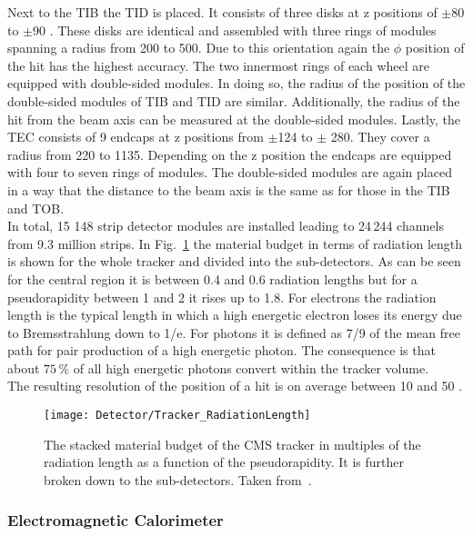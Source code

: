Next to the TIB the TID is placed. It consists of three disks at z positions of $\pm{}$80 to $\pm$90\cm{} . These disks are identical and assembled with three rings of modules spanning a radius from 200 to 500\mm{}. Due to this orientation again the $\phi{}$ position of the hit has the highest accuracy. The two innermost rings of each wheel are equipped with double-sided modules. In doing so, the radius of the position of the double-sided modules of TIB and TID are similar. Additionally, the radius of the hit from the beam axis can be measured at the double-sided modules. Lastly, the TEC consists of 9 endcaps at z positions from $\pm{}$124 to $\pm{}$ 280\cm{}. They cover a radius from 220 to 1135\mm{}. Depending on the z position the endcaps are equipped with four to seven rings of modules. The double-sided modules are again placed in a way that the distance to the beam axis is the same as for those in the TIB and TOB. \\
In total, 15 148 strip detector modules are installed leading to 24\,244 channels from 9.3 million strips. In Fig.~\ref{plot:LHCCMSTrackerRadiationLength} the material budget in terms of radiation length is shown for the whole tracker and divided into the sub-detectors. As can be seen for the central region it is between 0.4 and 0.6 radiation lengths but for a pseudorapidity between 1 and 2 it rises up to 1.8. For electrons the radiation length is the typical length in which a high energetic electron loses its energy due to Bremsstrahlung down to 1/e. For photons it is defined as 7/9 of the mean free path for pair production of a high energetic photon. The consequence is that about $75\,\%$ of all high energetic photons convert within the tracker volume.\\
The resulting resolution of the position of a hit is on average between 10 and 50\mum{} \cite{CMS-PAPER-TRK-11-001}.

\begin{figure}[Htb]
    \centering
    \texttt{[image: Detector/Tracker\_RadiationLength]}
    \caption[Material budget of the CMS Tracker]{The stacked material budget of the CMS tracker in multiples of the radiation length as a function of the pseudorapidity. It is further broken down to the sub-detectors. Taken from~. \label{plot:LHCCMSTrackerRadiationLength}}
\end{figure}

\subsubsection{Electromagnetic Calorimeter}

